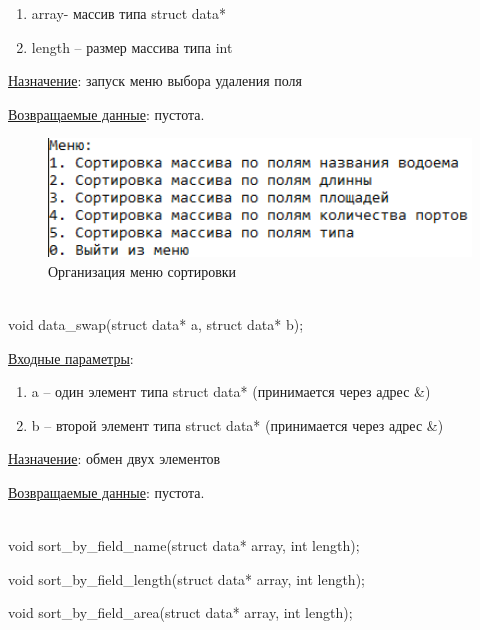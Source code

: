 \begin{enumerate}
    \item array- массив типа struct data*
    \item length – размер массива типа int
\end{enumerate}

\underline{Назначение}: запуск меню выбора удаления поля 

\underline{Возвращаемые данные}: пустота.

\begin{figure}[!hp]
    \begin{center}
        \includegraphics[width=16cm]{_input/programmDevelopment/sortmenu.png}
    \end{center}
    \caption{Организация меню сортировки\label{fig:sortmenu}}
\end{figure}

\hspace{0pt}\\



void data\_swap(struct data* a, struct data* b);

\underline{Входные параметры}:

\begin{enumerate}
    \item a – один элемент типа struct data* (принимается через адрес \&)
    \item b – второй элемент типа struct data* (принимается через адрес \&)
\end{enumerate}

\underline{Назначение}: обмен двух элементов 

\underline{Возвращаемые данные}: пустота.

\hspace{0pt}\\



void sort\_by\_field\_name(struct data* array, int length);

void sort\_by\_field\_length(struct data* array, int length);

void sort\_by\_field\_area(struct data* array, int length);

